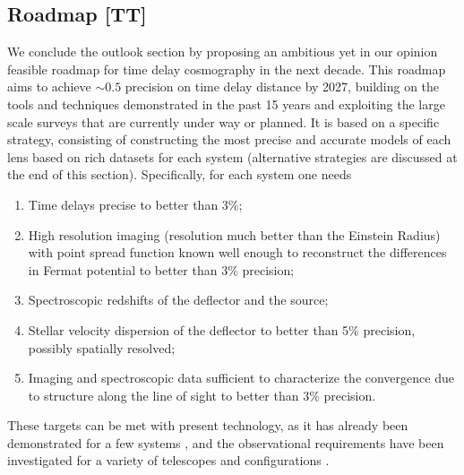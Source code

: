 \subsection{Roadmap [TT]}
\label{ssec:roadmap}

We conclude the outlook section by proposing an ambitious yet in our
opinion feasible roadmap for time delay cosmography in the next
decade. This roadmap aims to achieve $\sim0.5$ precision on time delay
distance by 2027, building on the tools and techniques demonstrated in
the past 15 years and exploiting the large scale surveys that are
currently under way or planned. It is based on a specific strategy,
consisting of constructing the most precise and accurate models of
each lens based on rich datasets for each system (alternative
strategies are discussed at the end of this section). Specifically,
for each system one needs

\begin{enumerate}
\item Time delays precise to better than $3\%$;
\item High resolution imaging (resolution much better than the Einstein Radius) with point spread function known well enough to reconstruct the differences in Fermat potential to better than $3\%$ precision;
\item Spectroscopic redshifts of the deflector and the source;
\item Stellar velocity dispersion of the deflector to better than 5\% precision, possibly spatially resolved;
\item Imaging and spectroscopic data sufficient to characterize the convergence due to structure along the line of sight to better than $3\%$ precision.
\end{enumerate}

These targets can be met with present technology, as it has already
been demonstrated for a few systems \citep{Tew++13,Suy++13}, and the
observational requirements have been investigated for a variety of
telescopes and configurations
\citep{Gre++13,CollettEtal2013,Men++15,Lin15}.

